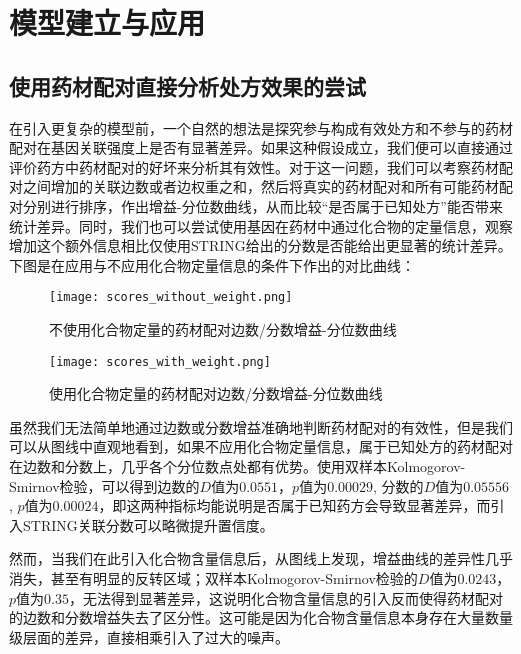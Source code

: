 
\chapter{模型建立与应用}

\section{使用药材配对直接分析处方效果的尝试}

在引入更复杂的模型前，一个自然的想法是探究参与构成有效处方和不参与的药材配对在基因关联强度上是否有显著差异。如果这种假设成立，我们便可以直接通过评价药方中药材配对的好坏来分析其有效性。对于这一问题，我们可以考察药材配对之间增加的关联边数或者边权重之和，然后将真实的药材配对和所有可能药材配对分别进行排序，作出增益-分位数曲线，从而比较“是否属于已知处方”能否带来统计差异。同时，我们也可以尝试使用基因在药材中通过化合物的定量信息，观察增加这个额外信息相比仅使用STRING给出的分数是否能给出更显著的统计差异。下图是在应用与不应用化合物定量信息的条件下作出的对比曲线：

\begin{figure}[H]
  \centering
  \texttt{[image: scores\_without\_weight.png]}
  \caption{不使用化合物定量的药材配对边数/分数增益-分位数曲线}
  \label{fig:score_without_weight}
\end{figure}

\begin{figure}[H]
  \centering
  \texttt{[image: scores\_with\_weight.png]}
  \caption{使用化合物定量的药材配对边数/分数增益-分位数曲线}
  \label{fig:scores_with_weight}
\end{figure}


虽然我们无法简单地通过边数或分数增益准确地判断药材配对的有效性，但是我们可以从图线中直观地看到，如果不应用化合物定量信息，属于已知处方的药材配对在边数和分数上，几乎各个分位数点处都有优势。使用双样本Kolmogorov-Smirnov检验，可以得到边数的$D$值为$0.0551$，$p$值为$0.00029$, 分数的$D$值为$0.05556$, $p$值为$0.00024$，即这两种指标均能说明是否属于已知药方会导致显著差异，而引入STRING关联分数可以略微提升置信度。

然而，当我们在此引入化合物含量信息后，从图线上发现，增益曲线的差异性几乎消失，甚至有明显的反转区域；双样本Kolmogorov-Smirnov检验的$D$值为$0.0243$，$p$值为$0.35$，无法得到显著差异，这说明化合物含量信息的引入反而使得药材配对的边数和分数增益失去了区分性。这可能是因为化合物含量信息本身存在大量数量级层面的差异，直接相乘引入了过大的噪声。

